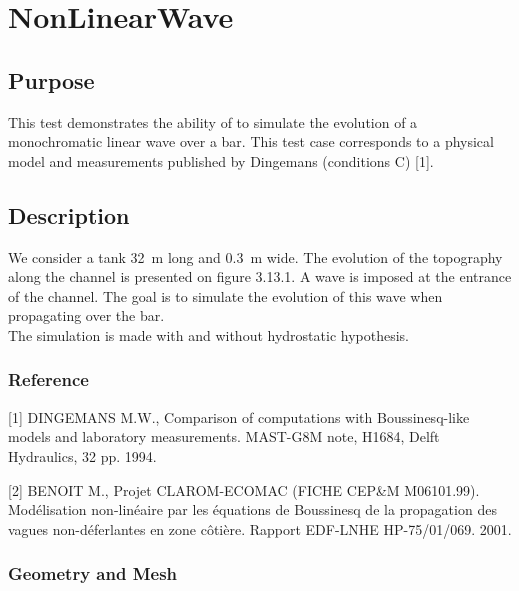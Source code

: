 \chapter{NonLinearWave}
%
%
\section{Purpose}
%
This test demonstrates the ability of  to simulate the
evolution of a monochromatic linear wave over a bar.
This test case corresponds to a physical model and measurements
published by Dingemans (conditions C) [1].
%
\section{Description}
%
We consider a tank 32~m long and 0.3~m wide.
The evolution of the topography along the channel is presented on figure
3.13.1.
A wave is imposed at the entrance of the channel.
The goal is to simulate the evolution of this wave when propagating over
the bar.\\
The simulation is made with and without hydrostatic hypothesis.
%
%
%
%
\subsection{Reference}
%
[1] DINGEMANS M.W., Comparison of computations with Boussinesq-like
models and laboratory measurements.
MAST-G8M note, H1684, Delft Hydraulics, 32 pp. 1994.

[2] BENOIT M., Projet CLAROM-ECOMAC (FICHE CEP\&M M06101.99).
Modélisation non-linéaire par les équations de Boussinesq de la
propagation des vagues non-déferlantes en zone côtière.
Rapport EDF-LNHE HP-75/01/069. 2001.
%
%
%
\subsection{Geometry and Mesh}
%
